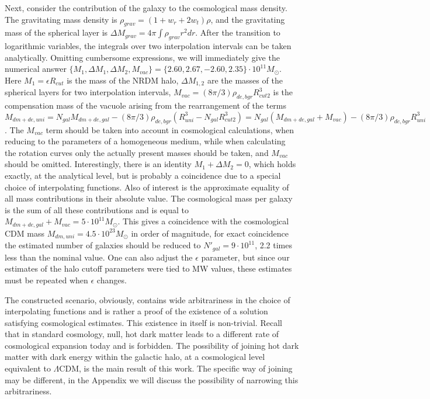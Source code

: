 \documentclass{article}
\begin{document}
Next, consider the contribution of the galaxy to the cosmological mass density. The gravitating mass density is $ \rho_ {grav} = (1 + w_r + 2w_t) \rho $, and the gravitating mass of the spherical layer is $ \Delta M_ {grav} = 4 \pi \int \rho_ {grav} r ^ 2dr $. After the transition to logarithmic variables, the integrals over two interpolation intervals can be taken analytically. Omitting cumbersome expressions, we will immediately give the numerical answer $ \{M_1, \Delta M_1, \Delta M_2, M_ {vac} \} = \{2.60, 2.67, -2.60, 2.35 \} \cdot10 ^ {11} M_ \odot $. Here $ M_1 = \epsilon R_ {cut} $ is the mass of the NRDM halo, $ \Delta M_ {1,2} $ are the masses of the spherical layers for two interpolation intervals, $ M_ {vac} = (8 \pi / 3) \rho_ {de, bgr} R_ {cut2} ^ 3 $ is the compensation mass of the vacuole arising from the rearrangement of the terms $ M_ {dm + de, uni} = N_ {gal} M_ {dm + de, gal} - (8 \pi / 3) \rho_ {de, bgr} (R_ {uni} ^ 3-N_ {gal} R_ {cut2} ^ 3) = N_ {gal} (M_ {dm + de, gal} + M_ {vac}) - (8 \pi / 3) \rho_ {de, bgr} R_ {uni} ^ 3 $. The $ M_ {vac} $ term should be taken into account in cosmological calculations, when reducing to the parameters of a homogeneous medium, while when calculating the rotation curves only the actually present masses should be taken, and $ M_ {vac} $ should be omitted. Interestingly, there is an identity $ M_1 + \Delta M_2 = 0 $, which holds exactly, at the analytical level, but is probably a coincidence due to a special choice of interpolating functions. Also of interest is the approximate equality of all mass contributions in their absolute value. The cosmological mass per galaxy is the sum of all these contributions and is equal to $ M_ {dm + de, gal} + M_ {vac} = 5 \cdot10 ^ {11} M_ \odot $. This gives a coincidence with the cosmological CDM mass $ M_ {dm, uni} = 4.5 \cdot10 ^ {23} M_ \odot $ in order of magnitude, for exact coincidence the estimated number of galaxies should be reduced to $ N '_ {gal} = 9 \cdot10 ^ {11} $, 2.2 times less than the nominal value. One can also adjust the $ \epsilon $ parameter, but since our estimates of the halo cutoff parameters were tied to MW values, these estimates must be repeated when $ \epsilon $ changes.

The constructed scenario, obviously, contains wide arbitrariness in the choice of interpolating functions and is rather a proof of the existence of a solution satisfying cosmological estimates. This existence in itself is non-trivial. Recall that in standard cosmology, null, hot dark matter leads to a different rate of cosmological expansion today and is forbidden. The possibility of joining hot dark matter with dark energy within the galactic halo, at a cosmological level equivalent to $ \Lambda $CDM, is the main result of this work. The specific way of joining may be different, in the Appendix we will discuss the possibility of narrowing this arbitrariness.
\end{document}

